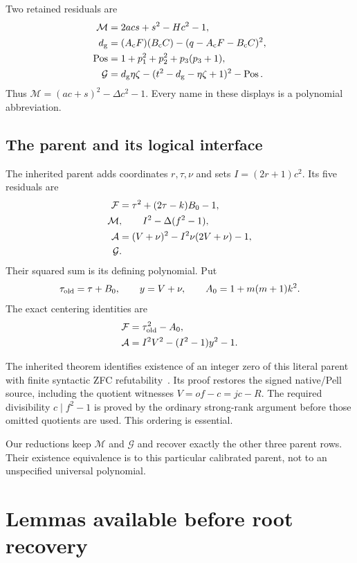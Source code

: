 \documentclass[11pt,letterpaper]{article}
\theoremstyle{remark}\newtheorem{remark}[theorem]{Remark}
\newcommand{\Pos}{\operatorname{Pos}}\newcommand{\ZFC}{\operatorname{ZFC}}
\begin{document}
Two retained residuals are
\begin{align}
 \mathcal M&=2acs+s^2-Hc^2-1,\label{eq:main}\\
 d_{\mathrm g}&=(A_{\mathrm c}F)(B_{\mathrm c}C)
       -(q-A_{\mathrm c}F-B_{\mathrm c}C)^2,\notag\\
 \Pos&=1+p_1^2+p_2^2+p_3(p_3+1),\notag\\
 \mathcal G&=d_{\mathrm g}\eta\zeta
       -(t^2-d_{\mathrm g}-\eta\zeta+1)^2-\Pos.\label{eq:guard}
\end{align}
Thus $\mathcal M=(ac+s)^2-\Delta c^2-1$.
Every name in these displays is a polynomial abbreviation.

\subsection{The parent and its logical interface}
The inherited parent adds coordinates $r,\tau,\nu$ and sets
$I=(2r+1)c^2$. Its five residuals are
\begin{align}
 \mathcal F&=\tau^2+(2\tau-k)B_0-1,\notag\\
 \mathcal M&,\qquad I^2-\Delta(f^2-1),\notag\\
 \mathcal A&=(V+\nu)^2-I^2\nu(2V+\nu)-1,\notag\\
 \mathcal G&.\label{eq:parent}
\end{align}
Their squared sum is its defining polynomial. Put
\[
 \tau_{\rm old}=\tau+B_0,\qquad y=V+\nu,\qquad
 A_0=1+m(m+1)k^2.
\]
The exact centering identities are
\begin{align}
 \mathcal F&=\tau_{\rm old}^2-A_0,\label{eq:firstcenter}\\
 \mathcal A&=I^2V^2-(I^2-1)y^2-1.\label{eq:auxcenter}
\end{align}

The inherited theorem identifies existence of an integer zero of this
literal parent with finite syntactic ZFC refutability~\cite{sat}.
Its proof restores the signed native/Pell source, including the quotient
witnesses $V=of-c=jc-R$. The required divisibility $c\mid f^2-1$ is
proved by the ordinary strong-rank argument before those omitted quotients
are used. This ordering is essential.

Our reductions keep $\mathcal M$ and $\mathcal G$ and recover exactly the
other three parent rows. Their existence equivalence is to this particular
calibrated parent, not to an unspecified universal polynomial.

\section{Lemmas available before root recovery}\label{sec:lemmas}
\end{document}
